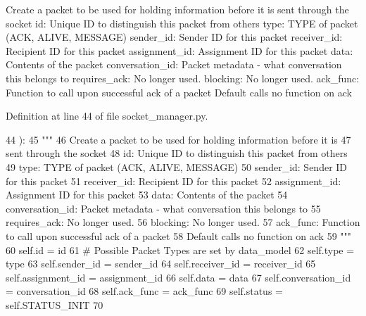 \begin{DoxyVerb}Create a packet to be used for holding information before it is
sent through the socket
id:               Unique ID to distinguish this packet from others
type:             TYPE of packet (ACK, ALIVE, MESSAGE)
sender_id:        Sender ID for this packet
receiver_id:      Recipient ID for this packet
assignment_id:    Assignment ID for this packet
data:             Contents of the packet
conversation_id:  Packet metadata - what conversation this belongs to
requires_ack:     No longer used.
blocking:         No longer used.
ack_func:         Function to call upon successful ack of a packet
           Default calls no function on ack
\end{DoxyVerb}
 

Definition at line 44 of file socket\+\_\+manager.\+py.


\begin{DoxyCode}
44     ):
45         \textcolor{stringliteral}{"""}
46 \textcolor{stringliteral}{        Create a packet to be used for holding information before it is}
47 \textcolor{stringliteral}{        sent through the socket}
48 \textcolor{stringliteral}{        id:               Unique ID to distinguish this packet from others}
49 \textcolor{stringliteral}{        type:             TYPE of packet (ACK, ALIVE, MESSAGE)}
50 \textcolor{stringliteral}{        sender\_id:        Sender ID for this packet}
51 \textcolor{stringliteral}{        receiver\_id:      Recipient ID for this packet}
52 \textcolor{stringliteral}{        assignment\_id:    Assignment ID for this packet}
53 \textcolor{stringliteral}{        data:             Contents of the packet}
54 \textcolor{stringliteral}{        conversation\_id:  Packet metadata - what conversation this belongs to}
55 \textcolor{stringliteral}{        requires\_ack:     No longer used.}
56 \textcolor{stringliteral}{        blocking:         No longer used.}
57 \textcolor{stringliteral}{        ack\_func:         Function to call upon successful ack of a packet}
58 \textcolor{stringliteral}{                           Default calls no function on ack}
59 \textcolor{stringliteral}{        """}
60         self.id = id
61         \textcolor{comment}{# Possible Packet Types are set by data\_model}
62         self.type = type
63         self.sender\_id = sender\_id
64         self.receiver\_id = receiver\_id
65         self.assignment\_id = assignment\_id
66         self.data = data
67         self.conversation\_id = conversation\_id
68         self.ack\_func = ack\_func
69         self.status = self.STATUS\_INIT
70 
\end{DoxyCode}


